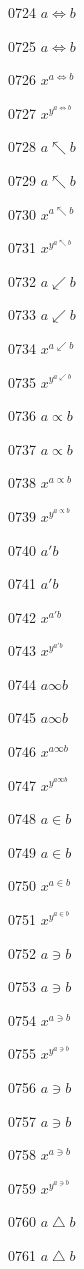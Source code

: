 \documentclass{article}
\begin{document}
0724 $a\Leftrightarrow b$\par
0725 $\displaystyle a\Leftrightarrow b$\par
0726 $x^{a\Leftrightarrow b}$\par
0727 $x^{y^{a\Leftrightarrow b}}$\par
0728 $a\nwarrow b$\par
0729 $\displaystyle a\nwarrow b$\par
0730 $x^{a\nwarrow b}$\par
0731 $x^{y^{a\nwarrow b}}$\par
0732 $a\swarrow b$\par
0733 $\displaystyle a\swarrow b$\par
0734 $x^{a\swarrow b}$\par
0735 $x^{y^{a\swarrow b}}$\par
0736 $a\propto b$\par
0737 $\displaystyle a\propto b$\par
0738 $x^{a\propto b}$\par
0739 $x^{y^{a\propto b}}$\par
0740 $a\prime b$\par
0741 $\displaystyle a\prime b$\par
0742 $x^{a\prime b}$\par
0743 $x^{y^{a\prime b}}$\par
0744 $a\infty b$\par
0745 $\displaystyle a\infty b$\par
0746 $x^{a\infty b}$\par
0747 $x^{y^{a\infty b}}$\par
0748 $a\in b$\par
0749 $\displaystyle a\in b$\par
0750 $x^{a\in b}$\par
0751 $x^{y^{a\in b}}$\par
0752 $a\ni b$\par
0753 $\displaystyle a\ni b$\par
0754 $x^{a\ni b}$\par
0755 $x^{y^{a\ni b}}$\par
0756 $a\owns b$\par
0757 $\displaystyle a\owns b$\par
0758 $x^{a\owns b}$\par
0759 $x^{y^{a\owns b}}$\par
0760 $a\bigtriangleup b$\par
0761 $\displaystyle a\bigtriangleup b$\par
\end{document}
